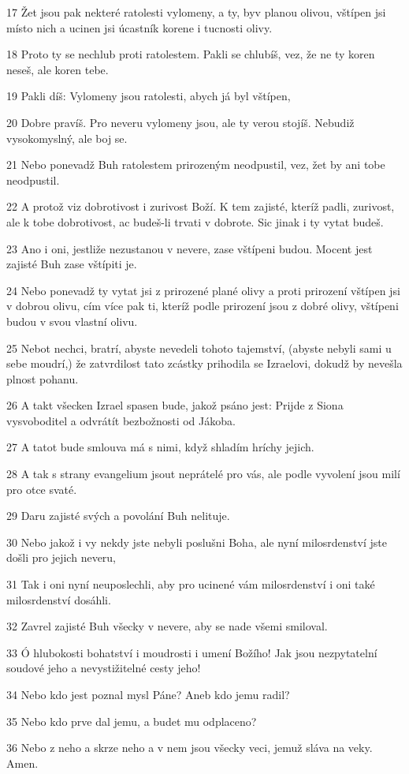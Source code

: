 \par 17 Žet jsou pak nekteré ratolesti vylomeny, a ty, byv planou olivou, vštípen jsi místo nich a ucinen jsi úcastník korene i tucnosti olivy.
\par 18 Proto ty se nechlub proti ratolestem. Pakli se chlubíš, vez, že ne ty koren neseš, ale koren tebe.
\par 19 Pakli díš: Vylomeny jsou ratolesti, abych já byl vštípen,
\par 20 Dobre pravíš. Pro neveru vylomeny jsou, ale ty verou stojíš. Nebudiž vysokomyslný, ale boj se.
\par 21 Nebo ponevadž Buh ratolestem prirozeným neodpustil, vez, žet by ani tobe neodpustil.
\par 22 A protož viz dobrotivost i zurivost Boží. K tem zajisté, kteríž padli, zurivost, ale k tobe dobrotivost, ac budeš-li trvati v dobrote. Sic jinak i ty vytat budeš.
\par 23 Ano i oni, jestliže nezustanou v nevere, zase vštípeni budou. Mocent jest zajisté Buh zase vštípiti je.
\par 24 Nebo ponevadž ty vytat jsi z prirozené plané olivy a proti prirození vštípen jsi v dobrou olivu, cím více pak ti, kteríž podle prirození jsou z dobré olivy, vštípeni budou v svou vlastní olivu.
\par 25 Nebot nechci, bratrí, abyste nevedeli tohoto tajemství, (abyste nebyli sami u sebe moudrí,) že zatvrdilost tato zcástky prihodila se Izraelovi, dokudž by nevešla plnost pohanu.
\par 26 A takt všecken Izrael spasen bude, jakož psáno jest: Prijde z Siona vysvoboditel a odvrátít bezbožnosti od Jákoba.
\par 27 A tatot bude smlouva má s nimi, když shladím hríchy jejich.
\par 28 A tak s strany evangelium jsout neprátelé pro vás, ale podle vyvolení jsou milí pro otce svaté.
\par 29 Daru zajisté svých a povolání Buh nelituje.
\par 30 Nebo jakož i vy nekdy jste nebyli poslušni Boha, ale nyní milosrdenství jste došli pro jejich neveru,
\par 31 Tak i oni nyní neuposlechli, aby pro ucinené vám milosrdenství i oni také milosrdenství dosáhli.
\par 32 Zavrel zajisté Buh všecky v nevere, aby se nade všemi smiloval.
\par 33 Ó hlubokosti bohatství i moudrosti i umení Božího! Jak jsou nezpytatelní soudové jeho a nevystižitelné cesty jeho!
\par 34 Nebo kdo jest poznal mysl Páne? Aneb kdo jemu radil?
\par 35 Nebo kdo prve dal jemu, a budet mu odplaceno?
\par 36 Nebo z neho a skrze neho a v nem jsou všecky veci, jemuž sláva na veky. Amen.

